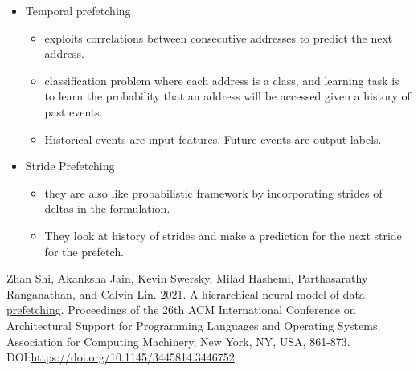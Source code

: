 \documentclass [12pt]{article}
\begin{document}
\begin{itemize}
            \item Temporal prefetching 
                \begin{itemize}
                    \item exploits correlations between consecutive addresses to predict the next address.
                    \item classification problem where each address is a class, and learning task is to learn the probability that an address will be accessed given a history of past events. 
                    \item Historical events are input features. Future events are output labels.
                \end{itemize}

            \item Stride Prefetching
                \begin{itemize}
                    \item they are also like probabilistic framework by incorporating strides of deltas in the formulation. 
                    \item They look at history of strides and make a prediction for the next stride for the prefetch. 
                \end{itemize}

            
        \end{itemize}

\begin{thebibliography}{1}
    Zhan Shi, Akanksha Jain, Kevin Swersky, Milad Hashemi, Parthasarathy Ranganathan, and Calvin Lin. 2021. \href{https://www.cs.utexas.edu/~akanksha/asplos21.pdf}{A hierarchical neural model of data prefetching}. Proceedings of the 26th ACM International Conference on Architectural Support for Programming Languages and Operating Systems. Association for Computing Machinery, New York, NY, USA, 861-873. DOI:\url{https://doi.org/10.1145/3445814.3446752}
\end{thebibliography}
\end{document}
